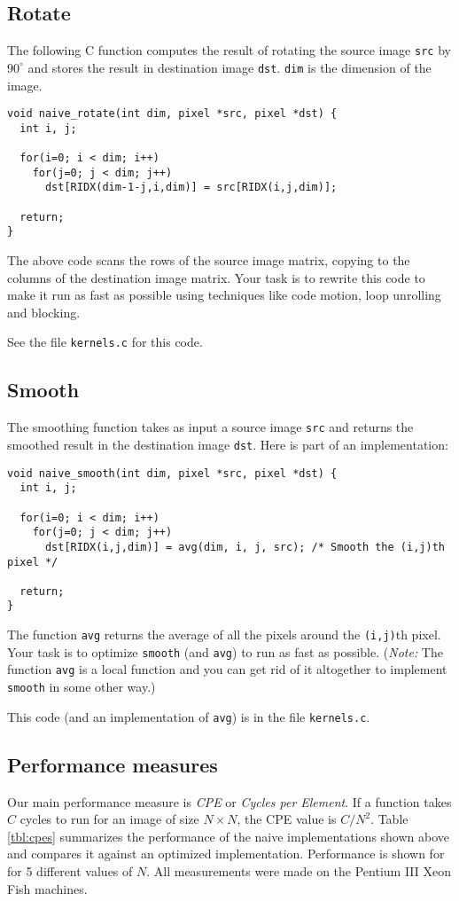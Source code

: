 \documentclass[11pt]{article}
\begin{document}
\subsection*{Rotate}
The following C function computes the result of rotating
the source image {\tt src} by $90^\circ$ and stores the result in
destination image {\tt dst}. {\tt dim} is the dimension of the image.
\small{\begin{verbatim}
void naive_rotate(int dim, pixel *src, pixel *dst) {
  int i, j;

  for(i=0; i < dim; i++)
    for(j=0; j < dim; j++)
      dst[RIDX(dim-1-j,i,dim)] = src[RIDX(i,j,dim)];

  return;
}
\end{verbatim}}
The above code scans the rows of the source image matrix, copying to
the columns of the destination image matrix.
Your task is to rewrite this code to make it run as fast as
possible using techniques like code motion, loop unrolling
and blocking.

See the file {\tt kernels.c} for this code.

\subsection*{Smooth}
The smoothing function takes as input a source image {\tt src} and
returns the smoothed result in the destination image {\tt dst}.
Here is part of an implementation:
\small{\begin{verbatim}
void naive_smooth(int dim, pixel *src, pixel *dst) {
  int i, j;

  for(i=0; i < dim; i++)
    for(j=0; j < dim; j++)
      dst[RIDX(i,j,dim)] = avg(dim, i, j, src); /* Smooth the (i,j)th pixel */

  return;
}
\end{verbatim}}
The function {\tt avg} returns the average of all the pixels around
the {\tt (i,j)}th pixel. Your task is to optimize {\tt smooth} (and
{\tt avg}) to run
as fast as possible. ({\em Note:} The function {\tt avg} is a local
function and you can get rid of it altogether to implement {\tt
smooth} in some other way.)

This code (and an implementation of {\tt avg}) is in the file {\tt kernels.c}.

\subsection*{Performance measures}
Our main performance measure is {\em CPE} or {\em Cycles per Element}.
If a function takes $C$ cycles to run for an image of size $N \times
N$, the CPE value is $C/N^2$.
Table \ref{tbl:cpes} summarizes the performance of the naive
implementations shown above and compares it against an optimized
implementation. Performance is shown for
for 5 different values of $N$. All measurements were made on the
Pentium III Xeon Fish machines.
\end{document}
